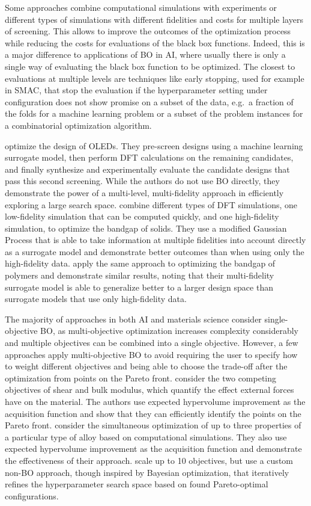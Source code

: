 \documentclass{article}
\begin{document}
Some approaches combine computational simulations with experiments or different
types of simulations with different fidelities and costs for multiple layers of
screening. This allows to improve the outcomes of the optimization process while
reducing the costs for evaluations of the black box functions. Indeed, this is a
major difference to applications of BO in AI, where usually there is only a
single way of evaluating the black box function to be optimized. The closest to
evaluations at multiple levels are techniques like early stopping, used for
example in SMAC, that stop the evaluation if the hyperparameter setting under
configuration does not show promise on a subset of the data, e.g.\ a fraction of
the folds for a machine learning problem or a subset of the problem instances
for a combinatorial optimization algorithm.

\cite{gomez-bombarelli_design_2016} optimize the design of OLEDs. They
pre-screen designs using a machine learning surrogate model, then perform DFT
calculations on the remaining candidates, and finally synthesize and
experimentally evaluate the candidate designs that pass this second screening.
While the authors do not use BO directly, they demonstrate the power of a
multi-level, multi-fidelity approach in efficiently exploring a large search
space. \cite{pilania_multi-fidelity_2017} combine different types of DFT
simulations, one low-fidelity simulation that can be computed quickly, and one
high-fidelity simulation, to optimize the bandgap of solids. They use a modified
Gaussian Process that is able to take information at multiple fidelities into
account directly as a surrogate model and demonstrate better outcomes than when
using only the high-fidelity data. \cite{patra_2020} apply the same approach to
optimizing the bandgap of polymers and demonstrate similar results, noting
that their multi-fidelity surrogate model is able to generalize better to a
larger design space than surrogate models that use only high-fidelity data.

The majority of approaches in both AI and materials science consider
single-objective BO, as multi-objective optimization increases complexity
considerably and multiple objectives can be combined into a single objective.
However, a few approaches apply multi-objective BO to avoid requiring the user
to specify how to weight different objectives and being able to choose the
trade-off after the optimization from points on the Pareto front.
\cite{talapatra_autonomous_2018} consider the two competing objectives of shear
and bulk modulus, which quantify the effect external forces have on the
material. The authors use expected hypervolume improvement as the acquisition
function and show that they can efficiently identify the points on the Pareto
front. \cite{solomou2018} consider the simultaneous optimization of up to three
properties of a particular type of alloy based on computational simulations.
They also use expected hypervolume improvement as the acquisition function and
demonstrate the effectiveness of their approach. \cite{Ragasa_2019} scale up to
10 objectives, but use a custom non-BO approach, though inspired by Bayesian
optimization, that iteratively refines the hyperparameter search space based on
found Pareto-optimal configurations.
\end{document}
